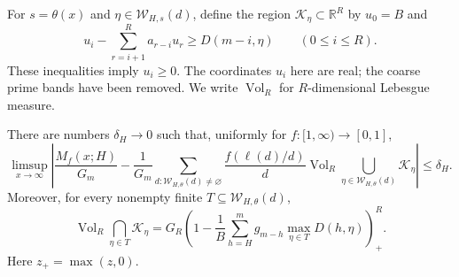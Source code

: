 For $s=\theta(x)$ and $\eta\in\mathcal W_{H,s}(d)$, define
the region $\mathcal K_\eta\subset\mathbb R^R$ by $u_0=B$ and
\begin{equation}
 u_i-\sum_{r=i+1}^Ra_{r-i}u_r\ge D(m-i,\eta)
 \qquad(0\le i\le R).
 \label{eq:prefix-region}
\end{equation}
These inequalities imply $u_i\ge0$.  The coordinates $u_i$ here are
real; the coarse prime bands have been removed.  We write
$\operatorname{Vol}_R$ for $R$-dimensional Lebesgue measure.

\begin{lemma}
\label{lem:tail-volume}
There are numbers $\delta_H\to0$ such that, uniformly for
$f:[1,\infty)\to[0,1]$,
\begin{equation}
 \limsup_{x\to\infty}
 \left|\frac{M_f(x;H)}{G_m}
 -\frac1{G_m}\sum_{d:\mathcal W_{H,\theta}(d)\ne\varnothing}
 \frac{f(\ell(d)/d)}d
 \operatorname{Vol}_R
 \bigcup_{\eta\in\mathcal W_{H,\theta}(d)}\mathcal K_\eta
 \right|\le\delta_H.
 \label{eq:mass-volume}
\end{equation}
Moreover, for every nonempty finite
$T\subseteq\mathcal W_{H,\theta}(d)$,
\begin{equation}
 \operatorname{Vol}_R\bigcap_{\eta\in T}\mathcal K_\eta
 =G_R\left(1-\frac1B\sum_{h=H}^m g_{m-h}
       \max_{\eta\in T}D(h,\eta)\right)_+^R.
 \label{eq:intersection-volume}
\end{equation}
Here $z_+=\max(z,0)$.
\end{lemma}

